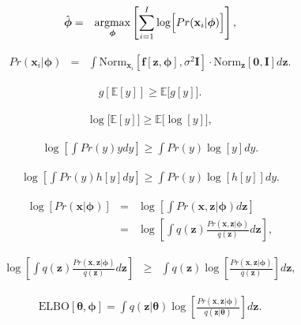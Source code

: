 \documentclass[letterpaper,twoside,openany, titlepage,oldfontcommands,titles,dvipsnames]{memoir}
\begin{document}
\begin{eqnarray}
  \hat{\boldsymbol\phi} &=& \mathop{\rm argmax}_{\boldsymbol\phi} \left[\sum_{i=1}^{I}\log\Bigl[Pr(\mathbf{x}_{i}|\boldsymbol\phi) \Bigr]\right],\label{eq:vae_log_like}
 \end{eqnarray}

\begin{eqnarray}
  Pr(\mathbf{x}_i|\boldsymbol\phi) &=& \int \mbox{Norm}_{\mathbf{x}_i}[\mathbf{f}[\mathbf{z},\boldsymbol\phi],\sigma^{2}\mathbf{I}]\cdot \mbox{Norm}_{\mathbf{z}}[\mathbf{0},\mathbf{I}]d\mathbf{z}.
 \end{eqnarray}



\begin{eqnarray}
  g[\mathbb{E}[y]] \geq \mathbb{E}\bigl[g[y]\bigr].
 \end{eqnarray}

\begin{eqnarray}\label{eq:vae_Jensen}
  \log\bigl[\mathbb{E}[y]\bigr]\geq\mathbb{E}\bigl[\log[y]\bigr], 
 \end{eqnarray}

\begin{eqnarray}\label{eq:vae_JensenInt}
  \log\left[\int Pr(y) y dy\right]\geq \int Pr(y)\log[y]dy.
 \end{eqnarray}

\begin{eqnarray}\label{eq:vae_JensenInt2}
  \log\left[\int Pr(y) h[y] dy\right]\geq \int Pr(y)\log[h[y]]dy.
 \end{eqnarray}



\begin{eqnarray}
 \log[Pr(\mathbf{x}|\boldsymbol\phi)] &=& \log\left[\int Pr(\mathbf{x},\mathbf{z}|\boldsymbol\phi)d\mathbf{z} \right]\nonumber\\
 &=& \log\left[\int q(\mathbf{z}) \frac{ Pr(\mathbf{x},\mathbf{z}|\boldsymbol\phi)}{q(\mathbf{z})}d\mathbf{z} \right],
 \end{eqnarray}

\begin{eqnarray}
 \log\left[\int q(\mathbf{z}) \frac{ Pr(\mathbf{x},\mathbf{z}|\boldsymbol\phi)}{q(\mathbf{z})}d\mathbf{z} \right]
 &\geq& \int q(\mathbf{z}) \log\left[\frac{ Pr(\mathbf{x},\mathbf{z}|\boldsymbol\phi)}{q(\mathbf{z})} \right]d\mathbf{z},\label{eq:vae_ELBOJensen}
 \end{eqnarray}

\begin{eqnarray}\label{eq:vae_ELBO}
 \mbox{ELBO}[\boldsymbol\theta, \boldsymbol\phi] = \int q(\mathbf{z}|\boldsymbol\theta) \log\left[\frac{ Pr(\mathbf{x},\mathbf{z}|\boldsymbol\phi)}{q(\mathbf{z}|\boldsymbol\theta)} \right]d\mathbf{z}.
 \end{eqnarray}
\end{document}
